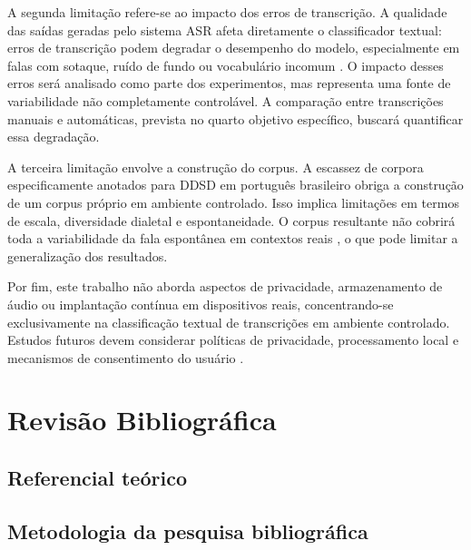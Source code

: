 \documentclass[
    12pt,                %
    openright,           %
    oneside,             %
    a4paper,             %
    english,             %
    brazil               %
]{abntex2}
\begin{document}
A segunda limitação refere-se ao impacto dos erros de transcrição. A qualidade das
saídas geradas pelo sistema ASR afeta diretamente o classificador textual: erros de
transcrição podem degradar o desempenho do modelo, especialmente em falas com sotaque,
ruído de fundo ou vocabulário incomum \cite{Bevilacqua2024}. O impacto desses erros será
analisado como parte dos experimentos, mas representa uma fonte de variabilidade não
completamente controlável. A comparação entre transcrições manuais e automáticas, prevista
no quarto objetivo específico, buscará quantificar essa degradação.

A terceira limitação envolve a construção do corpus. A escassez de corpora
especificamente anotados para DDSD em português brasileiro obriga a construção de um
corpus próprio em ambiente controlado. Isso implica limitações em termos de escala,
diversidade dialetal e espontaneidade. O corpus resultante não cobrirá toda a variabilidade
da fala espontânea em contextos reais \cite{CORAA2023}, o que pode limitar a generalização
dos resultados.

Por fim, este trabalho não aborda aspectos de privacidade, armazenamento de áudio ou
implantação contínua em dispositivos reais, concentrando-se exclusivamente na
classificação textual de transcrições em ambiente controlado. Estudos futuros devem
considerar políticas de privacidade, processamento local e mecanismos de consentimento
do usuário \cite{Chen2021}.

\chapter{Revisão Bibliográfica}
\label{cap:revisao}

\section{Referencial teórico}
\label{sec:referencial}


\section{Metodologia da pesquisa bibliográfica}
\label{sec:metodologia_pesquisa}
\end{document}
